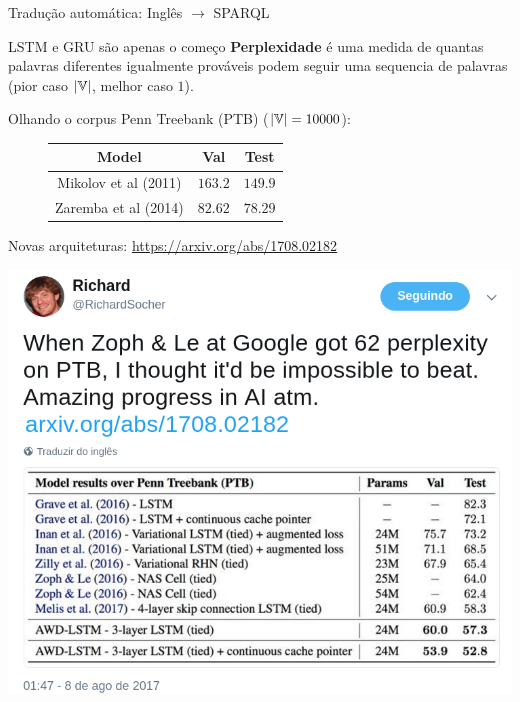 \documentclass[10pt]{beamer}
\begin{document}
\begin{frame}{Tradução automática: Inglês $\rightarrow$ SPARQL\cite{luzfinger2017}}

\end{frame}


\begin{frame}{LSTM e GRU são apenas o começo}
\textbf{Perplexidade} é uma medida de quantas palavras diferentes igualmente prováveis podem seguir uma sequencia de palavras (pior caso $|\mathbb{V}|$, melhor caso $1$). 

\vspace{0.5cm}

Olhando o corpus \alert{Penn Treebank (PTB)} ($|\mathbb{V}| = 10000$):

\vspace{0.5cm}

\begin{figure}
\begin{center}
\begin{tabular}{|c|c|c|}
\hline
\cellcolor{blue!60}Model & \cellcolor{blue!60}Val & \cellcolor{blue!60}Test  \\ \hline
Mikolov et al (2011)\cite{Mikolov11} & $163.2$  & $149.9$ \\ \hline
Zaremba et al (2014)\cite{DBLP:journals/corr/ZarembaSV14} & $82.62$  & $78.29$ \\ \hline
\end{tabular}
\end{center}
\end{figure}

\end{frame}

\begin{frame}{Novas arquiteturas: \url{https://arxiv.org/abs/1708.02182}}

\begin{center}
\includegraphics[scale=0.34]{images/SocherPTB.png}
\end{center}
\end{frame}
\end{document}
